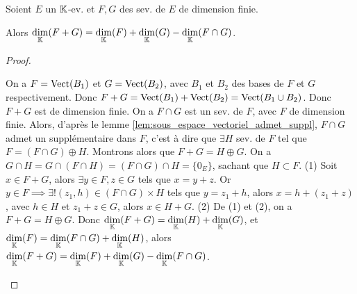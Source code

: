 \documentclass[12pt,a4paper]{report}
\begin{document}
\begin{theorem}
    Soient $E$ un $\mathbb{K}$-ev. et $F,G$ des sev. de $E$ de dimension finie.

    Alors $\underset{\mathbb{K}}\dim(F+G) = \underset{\mathbb{K}}\dim(F) + \underset{\mathbb{K}}\dim(G) - \underset{\mathbb{K}}\dim(F \cap G)$.
\end{theorem}

\begin{proof}
    \begin{outline}
        \1 On a $F= \mathrm{Vect}(B_1)$ et $G = \mathrm{Vect}(B_2)$, avec $B_1$ et $B_2$ des bases de $F$ et $G$ respectivement.
        \1 Donc $F+G = \mathrm{Vect}(B_1) + \mathrm{Vect}(B_2) = \mathrm{Vect}(B_1 \cup B_2)$.
        \1 Donc $F+G$ est de dimension finie.
        \1 On a $F \cap G$ est un sev. de $F$, avec $F$ de dimension finie.
        \1 Alors, d'après le lemme \ref{lem:sous_espace_vectoriel_admet_suppl}, $F \cap G$ admet un supplémentaire dans $F$, c'est à dire que $\exists H$ sev. de $F$ tel que $F = (F \cap G) \oplus H$.
        \1 Montrons alors que $F+G = H \oplus G$.
        \2 On a $G \cap H = G \cap (F \cap H) = (F \cap G) \cap H = \{0_E\}$, sachant que $H \subset F$. (1)
        \2 Soit $x \in F+G$, alors $\exists y \in F, z \in G$ tels que $x = y+z$.
        \2 Or $y \in F \implies \exists ! (z_1,h) \in (F\cap G)\times H$ tels que $y = z_1 + h$, alors $x = h + (z_1 + z)$, avec $h \in H$ et $z_1 + z \in G$, alors $x \in H + G$. (2)
        \2 De (1) et (2), on a $F+G = H \oplus G$.
        \1 Donc $\underset{\mathbb{K}}\dim(F+G) = \underset{\mathbb{K}}\dim(H) + \underset{\mathbb{K}}\dim(G)$, et $\underset{\mathbb{K}}\dim(F) = \underset{\mathbb{K}}\dim(F \cap G) + \underset{\mathbb{K}}\dim(H)$, alors $\underset{\mathbb{K}}\dim(F+G) = \underset{\mathbb{K}}\dim(F) + \underset{\mathbb{K}}\dim(G) - \underset{\mathbb{K}}\dim(F \cap G)$.
    \end{outline}
\end{proof}
\end{document}
